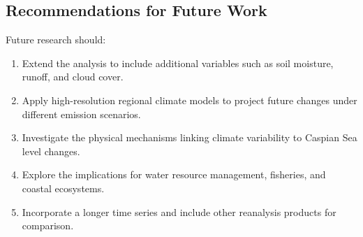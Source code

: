 \documentclass[12pt,a4paper]{article}
\begin{document}
\subsection{Recommendations for Future Work}
Future research should:
\begin{enumerate}
    \item Extend the analysis to include additional variables such as soil moisture, runoff, and cloud cover.
    \item Apply high-resolution regional climate models to project future changes under different emission scenarios.
    \item Investigate the physical mechanisms linking climate variability to Caspian Sea level changes.
    \item Explore the implications for water resource management, fisheries, and coastal ecosystems.
    \item Incorporate a longer time series and include other reanalysis products for comparison.
\end{enumerate}
\end{document}
